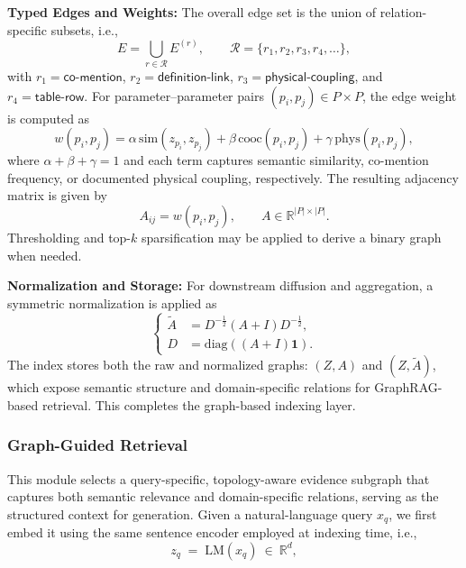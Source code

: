 \documentclass[journal]{IEEEtran}
\begin{document}
\textbf{Typed Edges and Weights:}
The overall edge set is the union of relation-specific subsets, i.e.,
\begin{equation}
E = \bigcup_{r \in \mathcal{R}} E^{(r)}, \qquad
\mathcal{R}=\{r_1,r_2,r_3,r_4,\ldots\},
\label{eq:typed_edges}
\end{equation}
with $r_1=\mathsf{co\text{-}mention}$, $r_2=\mathsf{definition\text{-}link}$, 
$r_3=\mathsf{physical\text{-}coupling}$, and $r_4=\mathsf{table\text{-}row}$.
 For parameter–parameter pairs $(p_i, p_j) \in P \times P$, the edge weight is computed as
\begin{equation}
w(p_i, p_j) =
\alpha \, \mathrm{sim}(z_{p_i}, z_{p_j}) +
\beta \, \mathrm{cooc}(p_i, p_j) +
\gamma \, \mathrm{phys}(p_i, p_j),
\label{eq:weight_mix}
\end{equation}
where $\alpha + \beta + \gamma = 1$ and each term captures semantic similarity, co-mention frequency, or documented physical coupling, respectively. The resulting adjacency matrix is given by
\begin{equation}
A_{ij} = w(p_i, p_j), \qquad A \in \mathbb{R}^{|P|\times|P|}.
\label{eq:adjacency}
\end{equation}
Thresholding and top-$k$ sparsification may be applied to derive a binary graph when needed.

\textbf{Normalization and Storage:}
For downstream diffusion and aggregation, a symmetric normalization is applied as
\begin{equation}
\left\{
\begin{aligned}
\widetilde{A} &= D^{-\tfrac{1}{2}} (A + I) D^{-\tfrac{1}{2}}, \\
D &= \mathrm{diag}\!\left((A + I)\mathbf{1}\right).
\end{aligned}
\right.
\label{eq:norm_adj}
\end{equation}
The index stores both the raw and normalized graphs: $(Z, A)$ and $(Z, \widetilde{A})$, which expose semantic structure and domain-specific relations for GraphRAG-based retrieval. This completes the graph-based indexing layer.


\subsubsection{Graph-Guided Retrieval}
\label{subsec:retrieval}

This module selects a query-specific, topology-aware evidence subgraph that captures both semantic relevance and domain-specific relations, serving as the structured context for generation. Given a natural-language query $x_q$, we first embed it using the same sentence encoder employed at indexing time, i.e.,
\begin{equation}
z_q \;=\; \mathrm{LM}(x_q)\ \in\ \mathbb{R}^{d},
\label{eq:query_embed}
\end{equation}
\end{document}
